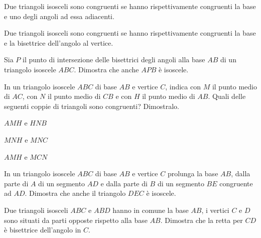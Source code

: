 \begin{multicols}{2}
\begin{esercizio}
Due triangoli isosceli sono congruenti se hanno rispettivamente 
congruenti la base e uno degli angoli ad essa adiacenti.
\end{esercizio}

\begin{esercizio}
Due triangoli isosceli sono congruenti se hanno rispettivamente 
congruenti la base e la bisettrice dell'angolo al vertice.
\end{esercizio}

\begin{esercizio}
Sia \(P\) il punto di intersezione delle bisettrici degli angoli alla 
base \(AB\) di un triangolo isoscele \(ABC\). Dimostra che anche \(APB\) è 
isoscele.
\end{esercizio}

\begin{esercizio}
In un triangolo isoscele \(ABC\) di base \(AB\) e vertice \(C\), indica con 
\(M\) il punto medio di \(AC\), con \(N\) il punto medio di \(CB\) e con 
\(H\) 
il punto medio di \(AB\). Quali delle seguenti coppie di triangoli sono 
congruenti? Dimostralo.
\begin{multicols}{2}
\begin{enumeratea}
\item \(AMH\) e \(HNB\)
\item \(MNH\) e \(MNC\)
\item \(AMH\) e \(MCN\)
\end{enumeratea}
\end{multicols}
\end{esercizio}

\begin{esercizio}
In un triangolo isoscele \(ABC\) di base \(AB\) e vertice \(C\) prolunga la 
base \(AB\), dalla parte di \(A\) di un segmento \(AD\) e dalla parte di 
\(B\) di un segmento \(BE\) congruente ad \(AD\). Dimostra che anche il 
triangolo \(DEC\) è isoscele.
\end{esercizio}

\begin{esercizio}
Due triangoli isosceli \(ABC\) e \(ABD\) hanno in comune la base \(AB\), i 
vertici \(C\) e \(D\) sono situati da parti opposte rispetto alla base 
\(AB\). Dimostra che la retta per \(CD\) è bisettrice dell'angolo in \(C\).
\end{esercizio}


\end{multicols}
